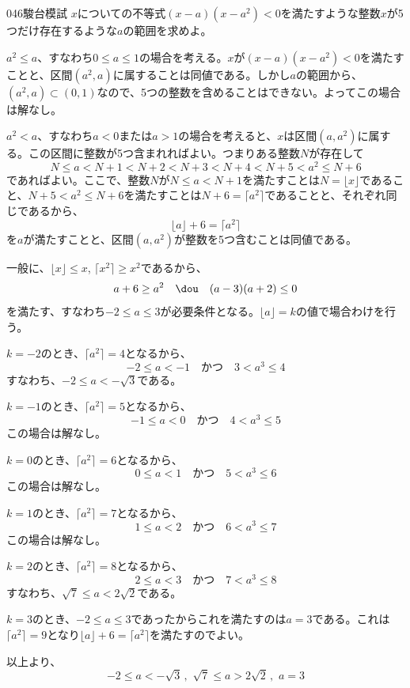 \begin{prob}{046}{\maru}{駿台模試}
 $x$についての不等式$(x-a)(x-a^2)<0$を満たすような整数$x$が5つだけ存在するような$a$の範囲を求めよ。
\end{prob}

$a^2\le a$、すなわち$0\le a\le 1$の場合を考える。$x$が$(x-a)(x-a^2)<0$を満たすことと、区間$(a^2, a)$に属することは同値である。しかし$a$の範囲から、$(a^2, a)\subset (0, 1)$なので、5つの整数を含めることはできない。よってこの場合は解なし。

$a^2<a$、すなわち$a<0$または$a>1$の場合を考えると、$x$は区間$(a, a^2)$に属する。この区間に整数が5つ含まれればよい。つまりある整数$N$が存在して
\[ N\le a<N+1<N+2<N+3<N+4<N+5<a^2\le N+6 \]
であればよい。ここで、整数$N$が$N\le a<N+1$を満たすことは$N=\lfloor x\rfloor$であること、$N+5<a^2\le N+6$を満たすことは$N+6=\lceil a^2\rceil$であることと、それぞれ同じであるから、
\[ \lfloor a\rfloor + 6=\lceil a^2\rceil \]
を$a$が満たすことと、区間$(a, a^2)$が整数を5つ含むことは同値である。

一般に、$\lfloor x\rfloor \le x$, $\lceil x^2\rceil \ge x^2$であるから、
\[ a+6\ge a^2 \quad\dou\quad (a-3)(a+2)\le 0 \]
を満たす、すなわち$-2\le a\le 3$が必要条件となる。$\lfloor a\rfloor=k$の値で場合わけを行う。

$k=-2$のとき、$\lceil a^2\rceil=4$となるから、
\[ -2\le a< -1 \quad\text{かつ}\quad 3<a^3\le 4 \]
すなわち、$-2\le a <-\sqrt{3}$である。

$k=-1$のとき、$\lceil a^2\rceil=5$となるから、
\[ -1\le a< 0 \quad\text{かつ}\quad 4<a^3\le 5 \]
この場合は解なし。

$k=0$のとき、$\lceil a^2\rceil=6$となるから、
\[ 0\le a< 1 \quad\text{かつ}\quad 5<a^3\le 6 \]
この場合は解なし。

$k=1$のとき、$\lceil a^2\rceil=7$となるから、
\[ 1\le a< 2 \quad\text{かつ}\quad 6<a^3\le 7 \]
この場合は解なし。

$k=2$のとき、$\lceil a^2\rceil=8$となるから、
\[ 2\le a< 3 \quad\text{かつ}\quad 7<a^3\le 8 \]
すなわち、$\sqrt{7}\le a <2\sqrt{2}$である。

$k=3$のとき、$-2\le a\le 3$であったからこれを満たすのは$a=3$である。これは$\lceil a^2\rceil=9$となり$\lfloor a\rfloor + 6=\lceil a^2\rceil$を満たすのでよい。

以上より、
\[ -2\le a<-\sqrt{3} \,,\,\, \sqrt{7}\le a>2\sqrt{2} \,,\,\, a=3 \]

